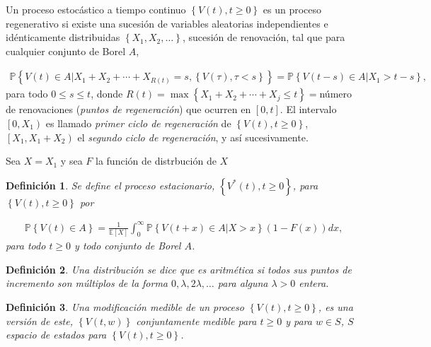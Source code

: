 \documentclass{article}
\newtheorem{Def}{Definición}
\newcommand{\esp}{\mathbb{E}}
\newcommand{\prob}{\mathbb{P}}
\begin{document}
Un proceso estoc\'astico a tiempo continuo $\left\{V\left(t\right),t\geq0\right\}$ es un proceso regenerativo si existe una sucesi\'on de variables aleatorias independientes e id\'enticamente distribuidas $\left\{X_{1},X_{2},\ldots\right\}$, sucesi\'on de renovaci\'on, tal que para cualquier conjunto de Borel $A$, 

\begin{eqnarray*}
\prob\left\{V\left(t\right)\in A|X_{1}+X_{2}+\cdots+X_{R\left(t\right)}=s,\left\{V\left(\tau\right),\tau<s\right\}\right\}=\prob\left\{V\left(t-s\right)\in A|X_{1}>t-s\right\},
\end{eqnarray*}
para todo $0\leq s\leq t$, donde $R\left(t\right)=\max\left\{X_{1}+X_{2}+\cdots+X_{j}\leq t\right\}=$n\'umero de renovaciones ({\emph{puntos de regeneraci\'on}}) que ocurren en $\left[0,t\right]$. El intervalo $\left[0,X_{1}\right)$ es llamado {\emph{primer ciclo de regeneraci\'on}} de $\left\{V\left(t \right),t\geq0\right\}$, $\left[X_{1},X_{1}+X_{2}\right)$ el {\emph{segundo ciclo de regeneraci\'on}}, y as\'i sucesivamente.

Sea $X=X_{1}$ y sea $F$ la funci\'on de distrbuci\'on de $X$


\begin{Def}
Se define el proceso estacionario, $\left\{V^{*}\left(t\right),t\geq0\right\}$, para $\left\{V\left(t\right),t\geq0\right\}$ por

\begin{eqnarray*}
\prob\left\{V\left(t\right)\in A\right\}=\frac{1}{\esp\left[X\right]}\int_{0}^{\infty}\prob\left\{V\left(t+x\right)\in A|X>x\right\}\left(1-F\left(x\right)\right)dx,
\end{eqnarray*} 
para todo $t\geq0$ y todo conjunto de Borel $A$.
\end{Def}

\begin{Def}
Una distribuci\'on se dice que es {\emph{aritm\'etica}} si todos sus puntos de incremento son m\'ultiplos de la forma $0,\lambda, 2\lambda,\ldots$ para alguna $\lambda>0$ entera.
\end{Def}


\begin{Def}
Una modificaci\'on medible de un proceso $\left\{V\left(t\right),t\geq0\right\}$, es una versi\'on de este, $\left\{V\left(t,w\right)\right\}$ conjuntamente medible para $t\geq0$ y para $w\in S$, $S$ espacio de estados para $\left\{V\left(t\right),t\geq0\right\}$.
\end{Def}
\end{document}
